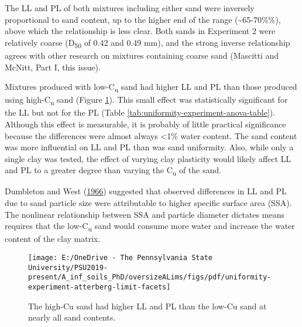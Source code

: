 \documentclass[
  letterpaper,
]{article}
\begin{document}
The LL and PL of both mixtures including either sand were inversely proportional to sand content, up to the higher end of the range (\textasciitilde65-70\%\%), above which the relationship is less clear.
Both sands in Experiment 2 were relatively coarse (D\textsubscript{50} of 0.42 and 0.49 mm), and the strong inverse relationship agrees with other research on mixtures containing coarse sand (Mascitti and McNitt, Part I, this issue).

Mixtures produced with low-C\textsubscript{u} sand had higher LL and PL than those produced using high-C\textsubscript{u} sand (Figure \ref{fig:uniformity-experiment-atterberg-limit-facets}).
This small effect was statistically significant for the LL but not for the PL (Table \ref{tab:uniformity-experiment-anova-table}).
Although this effect is measurable, it is probably of little practical significance because the differences were almost always \textless1\% water content.
The sand content was more influential on LL and PL than was sand uniformity.
Also, while only a single clay was tested, the effect of varying clay plasticity would likely affect LL and PL to a greater degree than varying the C\textsubscript{u} of the sand.

Dumbleton and West (\protect\hyperlink{ref-Dumbleton1966b}{1966}) suggested that observed differences in LL and PL due to sand particle size were attributable to higher specific surface area (SSA).
The nonlinear relationship between SSA and particle diameter dictates means requires that the low-C\textsubscript{u} sand would consume more water and increase the water content of the clay matrix.

\begin{figure}

{\centering \texttt{[image: E:/OneDrive - The Pennsylvania State University/PSU2019-present/A\_inf\_soils\_PhD/oversizeALims/figs/pdf/uniformity-experiment-atterberg-limit-facets]} 

}

\caption{The high-Cu sand had higher LL and PL than the low-Cu sand at nearly all sand contents.}\label{fig:uniformity-experiment-atterberg-limit-facets}
\end{figure}
\end{document}
